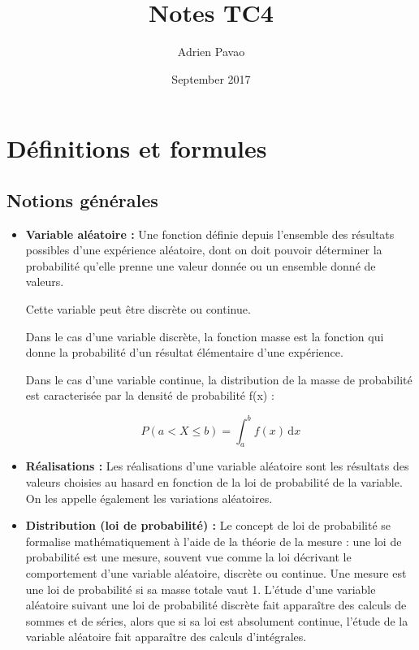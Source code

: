 \documentclass{article}
\title{Notes TC4}
\author{Adrien Pavao}
\date{September 2017}
\begin{document}
\maketitle

\tableofcontents

\section{Définitions et formules}

\subsection{Notions générales}

\begin{itemize}
\item \textbf{Variable aléatoire :} Une fonction définie depuis l'ensemble des résultats possibles d'une expérience aléatoire, dont on doit pouvoir déterminer la probabilité qu'elle prenne une valeur donnée ou un ensemble donné de valeurs. 

Cette variable peut être discrète ou continue.

Dans le cas d'une variable discrète, la fonction masse est la fonction qui donne la probabilité d'un résultat élémentaire d'une expérience.

Dans le cas d'une variable continue, la distribution de la masse de probabilité est caracterisée par la densité de probabilité f(x) : 

\[ P(a < X \leq b)  = \displaystyle \int_{a}^{b} f(x) \, \mathrm{d}x \]

\item \textbf{Réalisations :} Les réalisations d'une variable aléatoire sont les résultats des valeurs choisies au hasard en fonction de la loi de probabilité de la variable. On les appelle également les variations aléatoires.

\item \textbf{Distribution (loi de probabilité) :} Le concept de loi de probabilité se formalise mathématiquement à l'aide de la théorie de la mesure : une loi de probabilité est une mesure, souvent vue comme la loi décrivant le comportement d'une variable aléatoire, discrète ou continue. Une mesure est une loi de probabilité si sa masse totale vaut 1. L'étude d'une variable aléatoire suivant une loi de probabilité discrète fait apparaître des calculs de sommes et de séries, alors que si sa loi est absolument continue, l'étude de la variable aléatoire fait apparaître des calculs d'intégrales.


\end{itemize}
\end{document}
